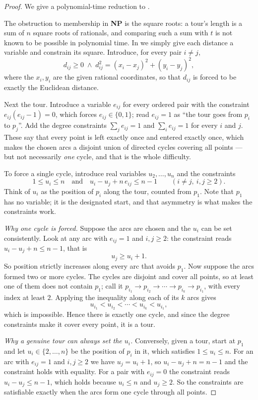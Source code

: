 \begin{proof}
We give a polynomial-time reduction to \ETR{}.

The obstruction to membership in \textbf{NP} is the square roots: a tour's
length is a sum of $n$ square roots of rationals, and comparing such a sum with
$t$ is not known to be possible in polynomial time. In \ETR{} we simply give
each distance a variable and constrain its square. Introduce, for every pair
$i \ne j$,
\[ d_{ij} \ge 0 \;\wedge\;
   d_{ij}^2 = (x_i-x_j)^2 + (y_i-y_j)^2, \]
where the $x_i, y_i$ are the given rational coordinates, so that $d_{ij}$ is
forced to be exactly the Euclidean distance.

Next the tour. Introduce a variable $e_{ij}$ for every ordered pair with the
constraint $e_{ij}(e_{ij}-1) = 0$, which forces $e_{ij} \in \{0,1\}$; read
$e_{ij} = 1$ as ``the tour goes from $p_i$ to $p_j$''. Add the degree
constraints $\sum_j e_{ij} = 1$ and $\sum_i e_{ij} = 1$ for every $i$ and $j$.
These say that every point is left exactly once and entered exactly once, which
makes the chosen arcs a disjoint union of directed cycles covering all points
--- but not necessarily \emph{one} cycle, and that is the whole difficulty.

To force a single cycle, introduce real variables $u_2, \ldots, u_n$ and the
constraints
\[ 1 \le u_i \le n \quad\text{and}\quad
   u_i - u_j + n\, e_{ij} \le n-1 \qquad (i \ne j,\ i,j \ge 2). \]
Think of $u_i$ as the position of $p_i$ along the tour, counted from $p_1$.
Note that $p_1$ has no variable; it is the designated start, and that asymmetry
is what makes the constraints work.

\emph{Why one cycle is forced.} Suppose the arcs are chosen and the $u_i$ can
be set consistently. Look at any arc with $e_{ij} = 1$ and $i,j \ge 2$: the
constraint reads $u_i - u_j + n \le n-1$, that is
\[ u_j \ge u_i + 1. \]
So position strictly increases along every arc that avoids $p_1$. Now suppose
the arcs formed two or more cycles. The cycles are disjoint and cover all
points, so at least one of them does not contain $p_1$; call it
$p_{i_1} \to p_{i_2} \to \cdots \to p_{i_k} \to p_{i_1}$, with every index at
least $2$. Applying the inequality along each of its $k$ arcs gives
\[ u_{i_1} < u_{i_2} < \cdots < u_{i_k} < u_{i_1}, \]
which is impossible. Hence there is exactly one cycle, and since the degree
constraints make it cover every point, it is a tour.

\emph{Why a genuine tour can always set the $u_i$.} Conversely, given a tour,
start at $p_1$ and let $u_i \in \{2,\ldots,n\}$ be the position of $p_i$ in it,
which satisfies $1 \le u_i \le n$. For an arc with $e_{ij} = 1$ and
$i,j \ge 2$ we have $u_j = u_i+1$, so $u_i - u_j + n = n-1$ and the constraint
holds with equality. For a pair with $e_{ij} = 0$ the constraint reads
$u_i - u_j \le n-1$, which holds because $u_i \le n$ and $u_j \ge 2$. So the
constraints are satisfiable exactly when the arcs form one cycle through all
points.


\end{proof}
